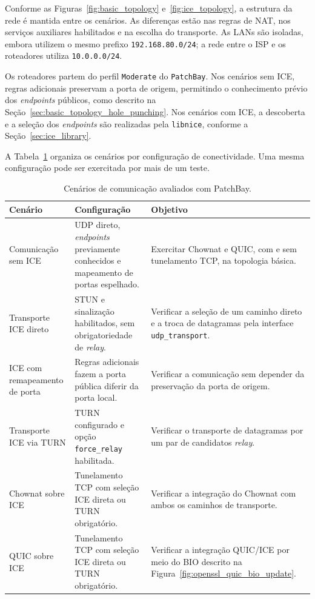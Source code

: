 Conforme as Figuras~\ref{fig:basic_topology} e~\ref{fig:ice_topology}, a estrutura da rede é mantida entre os cenários. As diferenças estão nas regras de NAT, nos serviços auxiliares habilitados e na escolha do transporte. As LANs são isoladas, embora utilizem o mesmo prefixo \texttt{192.168.80.0/24}; a rede entre o ISP e os roteadores utiliza \texttt{10.0.0.0/24}.

Os roteadores partem do perfil \texttt{Moderate} do \texttt{PatchBay}. Nos cenários sem ICE, regras adicionais preservam a porta de origem, permitindo o conhecimento prévio dos \textit{endpoints} públicos, como descrito na Seção~\ref{sec:basic_topology_hole_punching}. Nos cenários com ICE, a descoberta e a seleção dos \textit{endpoints} são realizadas pela \texttt{libnice}, conforme a Seção~\ref{sec:ice_library}.

A Tabela~\ref{tab:experimental_scenarios} organiza os cenários por configuração de conectividade. Uma mesma configuração pode ser exercitada por mais de um teste.

\begin{table}[htbp]
    \centering
    \small
    \begin{tabular}{@{}p{}p{}p{}@{}}
        \toprule
        \textbf{Cenário} &
        \textbf{Configuração} &
        \textbf{Objetivo} \\
        \midrule
        Comunicação sem ICE &
        UDP direto, \textit{endpoints} previamente conhecidos
        e mapeamento de portas espelhado. &
        Exercitar Chownat e QUIC, com e sem tunelamento
        TCP, na topologia básica. \\
        Transporte ICE direto &
        STUN e sinalização habilitados, sem
        obrigatoriedade de \textit{relay}. &
        Verificar a seleção de um caminho direto
        e a troca de datagramas pela interface
        \texttt{udp\_transport}. \\
        ICE com remapeamento de porta &
        Regras adicionais fazem a porta pública
        diferir da porta local. &
        Verificar a comunicação sem depender
        da preservação da porta de origem. \\
        Transporte ICE via TURN &
        TURN configurado e opção
        \texttt{force\_relay} habilitada. &
        Verificar o transporte de datagramas por
        um par de candidatos \textit{relay}. \\
        Chownat sobre ICE &
        Tunelamento TCP com seleção ICE direta
        ou TURN obrigatório. &
        Verificar a integração do Chownat com
        ambos os caminhos de transporte. \\
        QUIC sobre ICE &
        Tunelamento TCP com seleção ICE direta
        ou TURN obrigatório. &
        Verificar a integração QUIC/ICE por meio
        do BIO descrito na
        Figura~\ref{fig:openssl_quic_bio_update}. \\
        \bottomrule
    \end{tabular}
    \caption{Cenários de comunicação avaliados com PatchBay.}
    \label{tab:experimental_scenarios}
\end{table}

